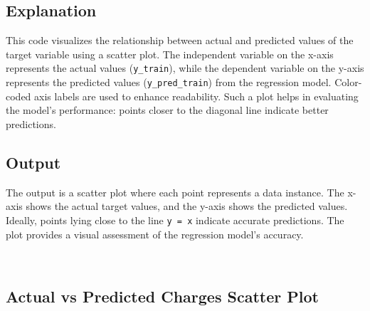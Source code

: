 \documentclass[11pt]{article}
\begin{document}
\subsection*{Explanation}
This code visualizes the relationship between actual and predicted values of the target variable using a scatter plot. The independent variable on the x-axis represents the actual values (\texttt{y\_train}), while the dependent variable on the y-axis represents the predicted values (\texttt{y\_pred\_train}) from the regression model. Color-coded axis labels are used to enhance readability. Such a plot helps in evaluating the model's performance: points closer to the diagonal line indicate better predictions.

\subsection*{Output}
The output is a scatter plot where each point represents a data instance. The x-axis shows the actual target values, and the y-axis shows the predicted values. Ideally, points lying close to the line \texttt{y = x} indicate accurate predictions. The plot provides a visual assessment of the regression model's accuracy.
    \begin{center}
    \end{center}
    { \hspace*{\fill} \\}
 
 
 
 \subsection{Actual vs Predicted Charges Scatter Plot}
\end{document}

